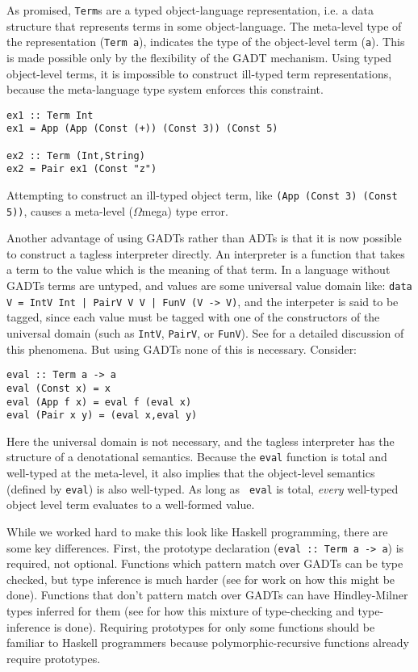 \documentclass{sigplanconf}
\newcommand{\om}{$\Omega$mega}
\begin{document}
As promised, {\tt Term}s are a typed object-language representation, i.e. a data
structure that represents terms in some object-language. The meta-level
type of the representation ({\tt Term a}), indicates the type 
of the object-level term ({\tt a}). This is made possible only by the flexibility of
the GADT mechanism. Using typed object-level terms,
it is impossible to construct ill-typed term representations, because
the meta-language type system enforces this constraint.
\begin{verbatim}
ex1 :: Term Int  
ex1 = App (App (Const (+)) (Const 3)) (Const 5)

ex2 :: Term (Int,String)
ex2 = Pair ex1 (Const "z")
\end{verbatim}
Attempting to construct an ill-typed object term, like {\tt (App (Const 3) (Const 5))},
causes a meta-level (\om) type error. 

Another advantage of using GADTs rather than ADTs is that it is now possible to
construct a tagless\cite{SheardPasalic2002,Taha:2001:TEJ,TahaTag2000}
interpreter directly. An interpreter is a function that takes a term to the
value which is the meaning of that term. In a language without GADTs terms are
untyped, and values are some universal value domain like: {\tt data V = IntV
Int | PairV V V | FunV (V -> V)}, and the interpeter is said to be tagged,
since each value must be tagged with one of the constructors of the universal
domain (such as {\tt IntV}, {\tt PairV}, or {\tt FunV}). See
\cite{PasalicLingerGpce} for a detailed discussion of this phenomena.
But using GADTs none of this is necessary. Consider:

\begin{verbatim}
eval :: Term a -> a
eval (Const x) = x
eval (App f x) = eval f (eval x)
eval (Pair x y) = (eval x,eval y)
\end{verbatim}

\noindent
Here the universal domain is not necessary, and the tagless interpreter has the structure of a
denotational semantics. Because the {\tt eval} function is total and
well-typed at the meta-level, it also implies that the object-level
semantics (defined by {\tt eval}) is also well-typed. As long as {\tt
eval} is total, {\em every} well-typed object level term evaluates to
a well-formed value.

While we worked hard to make this look like Haskell programming, there
are some key differences. First, the prototype declaration ({\tt eval :: Term
a -> a}) is required, not optional. Functions which pattern match over
GADTs can be type checked, but type inference is much harder (see
\cite{pottier3} for work on how this might be done). Functions that
don't pattern match over GADTs can have Hindley-Milner types inferred
for them (see \cite{wobbly} for how this mixture of type-checking and
type-inference is done). Requiring prototypes for only some functions
should be familiar to Haskell programmers because polymorphic-recursive
functions already require prototypes\cite{oai:CiteSeerPSU:312481}. 
\end{document}
